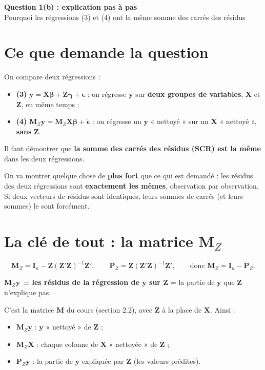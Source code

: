 \documentclass[11pt,a4paper]{article}
\newcommand{\vy}{\mathbf{y}}\newcommand{\vX}{\mathbf{X}}\newcommand{\vZ}{\mathbf{Z}}
\newcommand{\vbeta}{\bm{\beta}}\newcommand{\veps}{\bm{\epsilon}}
\newcommand{\I}{\mathbf{I}}
\newcommand{\Mz}{\mathbf{M}_Z}\newcommand{\Pz}{\mathbf{P}_Z}
\begin{document}
\begin{center}
{\LARGE\bfseries Question 1(b) : explication pas à pas}\\[6pt]
{\large Pourquoi les régressions (3) et (4) ont la même somme des carrés des résidus}
\end{center}

\tableofcontents

\section{Ce que demande la question}

On compare deux régressions :
\begin{itemize}
\item \textbf{(3)} \quad $\vy=\vX\vbeta+\vZ\bm\gamma+\veps$ : on régresse $\vy$ sur \textbf{deux groupes de variables}, $\vX$ et $\vZ$, en même temps ;
\item \textbf{(4)} \quad $\Mz\vy=\Mz\vX\vbeta+\tilde{\veps}$ : on régresse un $\vy$ « nettoyé » sur un $\vX$ « nettoyé », \textbf{sans} $\vZ$.
\end{itemize}

Il faut démontrer que \textbf{la somme des carrés des résidus (SCR) est la même} dans les deux régressions.

\begin{cle}
On va montrer quelque chose de \textbf{plus fort} que ce qui est demandé : les résidus des deux régressions sont \textbf{exactement les mêmes}, observation par observation. Si deux vecteurs de résidus sont identiques, leurs sommes de carrés (et leurs sommes) le sont forcément.
\end{cle}

\section{La clé de tout : la matrice $\Mz$}

\[
\Mz=\I_n-\vZ(\vZ'\vZ)^{-1}\vZ' ,\qquad \Pz=\vZ(\vZ'\vZ)^{-1}\vZ',\qquad \text{donc } \Mz=\I_n-\Pz .
\]

\begin{cle}
\textbf{$\Mz\vy$ = les résidus de la régression de $\vy$ sur $\vZ$} = la partie de $\vy$ que $\vZ$ n'explique pas.

C'est la matrice $\mathbf M$ du cours (section 2.2), avec $\vZ$ à la place de $\vX$. Ainsi :
\begin{itemize}[nosep]
\item $\Mz\vy$ : $\vy$ « nettoyé » de $\vZ$ ;
\item $\Mz\vX$ : chaque colonne de $\vX$ « nettoyée » de $\vZ$ ;
\item $\Pz\vy$ : la partie de $\vy$ expliquée par $\vZ$ (les valeurs prédites).
\end{itemize}
\end{cle}
\end{document}
